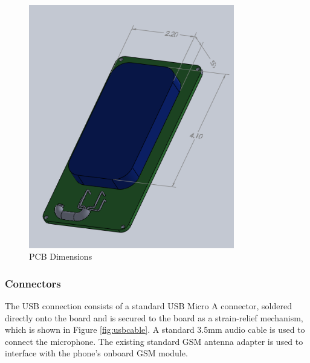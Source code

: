\documentclass{article}
\numberwithin{figure}{section}
\numberwithin{equation}{section}
\begin{document}
{\begin{figure}[H]
	\centering
	\includegraphics[width=0.8\textwidth]{PhoneAndPCB}
	\caption{PCB Dimensions}
	\label{fig:pcbphone}
\end{figure}

\subsubsection{Connectors}

The USB connection consists of a standard USB Micro A connector, soldered directly onto the board and is secured to the board as a strain-relief mechanism, which is shown in Figure \ref{fig:usbcable}. A standard 3.5mm audio cable is used to connect the microphone. The existing standard GSM antenna adapter is used to interface with the phone’s onboard GSM module.

}
\end{document}
